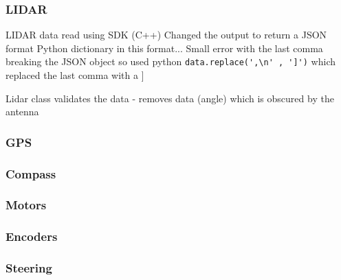\subsubsection{LIDAR}
\gls{LIDAR} data read using SDK (C++)
Changed the output to return a JSON format
Python dictionary in this format...
Small error with the last comma breaking the JSON object so used python \lstinline{data.replace(',\n' , ']')} which replaced the last comma with a ]

Lidar class validates the data
 - removes data (angle) which is obscured by the antenna


\subsubsection{GPS}

\subsubsection{Compass}

\subsubsection{Motors}

\subsubsection{Encoders}

\subsubsection{Steering}
